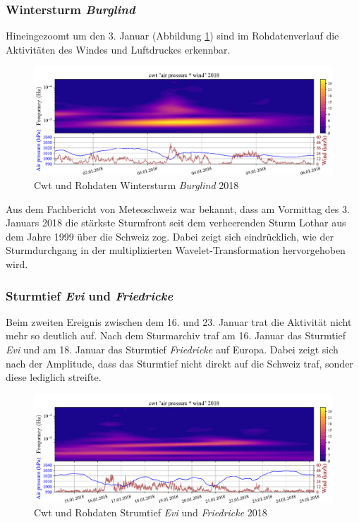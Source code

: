 \begin{refsection}
\subsubsection{Wintersturm {\em Burglind} }
\label{burglind}
Hineingezoomt um den 3. Januar (Abbildung \ref{fig:cwt_storm_zoom}) sind im Rohdatenverlauf die Aktivitäten des Windes und Luftdruckes erkennbar. 
\begin{figure}[h]
	\centering
	\includegraphics[width=1\textwidth]{papers/wwt/images/storm_airp_wind_zoom.pdf}
	\caption{Cwt und Rohdaten Wintersturm {\em Burglind}  2018}
	\label{fig:cwt_storm_zoom}
\end{figure}
Aus dem Fachbericht \space \cite{Fachbericht:Burglind} von Meteoschweiz war bekannt, dass am Vormittag des 3. Januars 2018 die stärkste Sturmfront seit dem verheerenden Sturm Lothar aus dem Jahre 1999 über die Schweiz zog.
Dabei zeigt sich eindrücklich, wie der Sturmdurchgang in der multiplizierten Wavelet-Transformation hervorgehoben wird.

\subsubsection{Sturmtief {\em Evi}  und {\em Friedricke} }
\label{evi}
Beim zweiten Ereignis zwischen dem 16. und 23. Januar trat die Aktivität nicht mehr so deutlich auf.
Nach dem Sturmarchiv  \cite{online:sturmarchiv} traf am 16. Januar das Sturmtief {\em Evi}  und am 18. Januar das Sturmtief {\em Friedricke} auf Europa. Dabei zeigt sich nach der Amplitude, dass das Sturmtief nicht direkt auf die Schweiz traf, sonder diese lediglich streifte. 

\begin{figure}[h]
	\centering
	\includegraphics[width=1\textwidth]{papers/wwt/images/storm_airp_wind_zoom2.pdf}
	\caption{Cwt und Rohdaten Strumtief {\em Evi}  und {\em Friedricke} 2018}
	\label{fig:cwt_storm_zoom2}
\end{figure}




\end{refsection}
